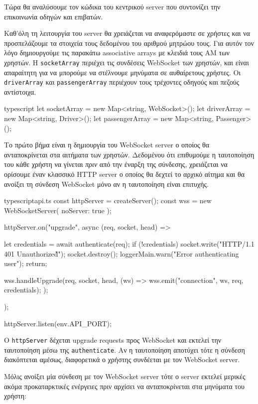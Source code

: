 \documentclass[../thesis.tex]{subfiles}
\begin{document}
Τώρα θα αναλύσουμε τον κώδικα του κεντρικού server που συντονίζει την επικοινωνία οδηγών και επιβατών.

Καθ'όλη τη λειτουργία του server θα χρειάζεται να αναφερόμαστε σε χρήστες και να προσπελάζουμε τα στοιχεία τους δεδομένου του αριθμού μητρώου τους.
Για αυτόν τον λόγο δημιουργούμε τις παρακάτω associative arrays με κλειδιά τους ΑΜ των χρηστών.
Η \texttt{socketArray} περιέχει τις συνδέσεις WebSocket των χρηστών, και είναι απαραίτητη για να μπορούμε να στέλνουμε μηνύματα σε αυθαίρετους χρήστες.
Οι \texttt{driverArray} και \texttt{passengerArray} περιέχουν τους τρέχοντες οδηγούς και πεζούς αντίστοιχα. 

\begin{codeblock}{typescript}
  let socketArray = new Map<string, WebSocket>();
  let driverArray = new Map<string, Driver>();
  let passengerArray = new Map<string, Passenger>();
\end{codeblock}

Το πρώτο βήμα είναι η δημιουργία του WebSocket server ο οποίος θα ανταποκρίνεται στα αιτήματα των χρηστών.
Δεδομένου ότι επιθυμούμε η ταυτοποίηση του κάθε χρήστη να γίνεται \textit{πριν} από την έναρξη της σύνδεσης, χρειάζεται να ορίσουμε έναν κλασσικό HTTP server ο οποίος θα δεχτεί το αρχικό αίτημα και θα ανοίξει τη σύνδεση WebSocket μόνο αν η ταυτοποίηση είναι επιτυχής.

\begin{codeblock}{typescript}{api.ts}
  const httpServer = createServer();
  const wss = new WebSocketServer({ noServer: true });

  httpServer.on("upgrade", async (req, socket, head) => {
    let credentials = await authenticate(req);
    if (!credentials) {
      socket.write("HTTP/1.1 401 Unauthorized\r\n\r\n");
      socket.destroy();
      loggerMain.warn("Error authenticating user");
      return;
    }

    wss.handleUpgrade(req, socket, head, (ws) => {
      wss.emit("connection", ws, req, credentials);
    });
  });  

  httpServer.listen(env.API_PORT);
\end{codeblock}

Ο \texttt{httpServer} δέχεται upgrade requests προς WebSocket και εκτελεί την ταυτοποίηση μέσω της \texttt{authenticate}.
Αν η ταυτοποίηση αποτύχει τότε η σύνδεση διακόπτεται αμέσως, διαφορετικά ο χρήστης συνδέεται με τον WebSocket server.

Μόλις ανοίξει μία σύνδεση με τον WebSocket server τότε ο server εκτελεί μερικές ακόμα προκαταρκτικές ενέργειες πριν αρχίσει να ανταποκρίνεται στα μηνύματα του χρήστη:
\end{document}
